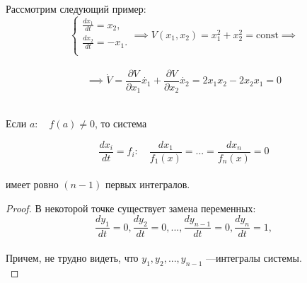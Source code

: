 \begin{example}
	Рассмотрим следующий пример:
	$$
		\begin{cases}
			\frac{dx_1}{dt}=x_2, \\
			\frac{dx_2}{dt}= - x_1.\\
		\end{cases} \implies V(x_1, x_2) = x_1^2 + x_2^2 = \mbox{const} \implies
	$$\\

	$$
		\implies \dot{V}=\frac{\partial V}{\partial x_1}\dot{x_1}+\frac{\partial V}{\partial x_2}\dot{x_2}=2x_1x_2-2x_2x_1=0
	$$\\

\end{example}

\begin{lemma}
	
	Если $a: \quad f(a) \ne 0$, то система
	
	$$
		\frac{dx_i}{d t} = f_i: \quad \frac{dx_1}{f_1(x)} = ... = \frac{dx_n}{f_n(x)} = 0
	$$\\
	имеет ровно $(n-1)$ первых интегралов.\\
	\begin{proof}
	В некоторой точке существует замена переменных:
	$$
		\frac{dy_1}{dt}=0,\frac{dy_2}{dt}=0,...,\frac{dy_{n-1}}{dt}=0,\frac{dy_n}{dt}=1,
	$$\\
	Причем, не трудно видеть, что $y_1,y_2,...,y_{n-1}$ ---интегралы системы.\\
	\end{proof}

\end{lemma}

